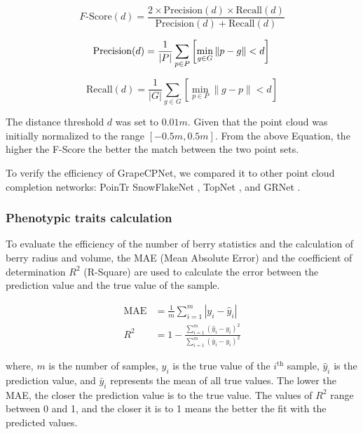 \documentclass[12pt]{article}
\begin{document}
\begin{equation}
    F\text{-Score}(d) = \frac{2 \times \text{Precision}(d) \times \text{Recall}(d)}{\text{Precision}(d) + \text{Recall}(d)} 
\label{eq:9}
\end{equation}


\begin{equation}
    \text{Precision}(d) = \frac{1}{|P|} \sum_{p \in P} \left[ \min_{g \in G} \|p - g\| < d \right]\\
\label{eq:10}
\end{equation}

\begin{equation}
    \text{Recall}(d) = \frac{1}{|G|} \sum_{g \in G} \left[ \min_{p \in P} \|g - p\| < d \right]
\label{eq:11}
\end{equation}

{\raggedright The distance threshold $d$ was set to $0.01m$. Given that the point cloud was initially normalized to the range $[-0.5m, 0.5m]$. 
From the above Equation, the higher the F-Score the better the match between the two point sets.}

To verify the efficiency of GrapeCPNet, we compared it to other point cloud completion networks: PoinTr \citep{yu_pointr_2021} SnowFlakeNet \citep{xiang_snowflakenet_2021}, TopNet \citep{tchapmi_topnet_2019}, and GRNet \citep{xie_grnet_2020}.

\subsubsection{Phenotypic traits calculation}
\label{sec:253}
To evaluate the efficiency of the number of berry statistics and the calculation of berry radius and volume, the MAE (Mean Absolute Error) and the coefficient of determination $R^2$ (R-Square) are used to calculate the error between the prediction value and the true value of the sample.

\begin{align}
    \text{MAE} &= \frac{1}{m} \sum_{i=1}^{m} |y_i - \hat{y}_i| \tag{12}\\
    R^2 &= 1 - \frac{\sum_{i=1}^{m} (\hat{y}_i - y_i)^2}{\sum_{i=1}^{m} (\bar{y}_i - y_i)^2} \tag{13}
\end{align}

{\raggedright where, $m$ is the number of samples, $y_i$ is the true value of the $i^{\text{th}}$ sample, $\hat{y}_i$ is the prediction value, and $\bar{y}_i$ represents the mean of all true values. 
The lower the MAE, the closer the prediction value is to the true value. The values of $R^2$ range between 0 and 1, and the closer it is to 1 means the better the fit with the predicted values.}
\end{document}
